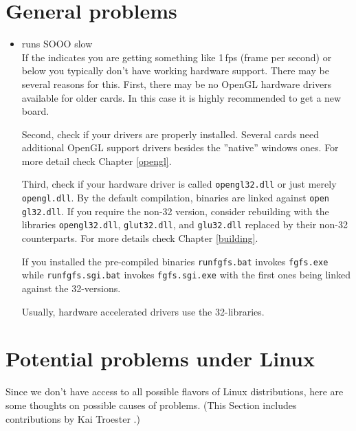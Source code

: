 \section{General problems}
\begin{itemize}
\item{\FlightGear runs SOOO slow}\\
 If the  indicates you are getting something like 1\,fps
 (frame per second) or below you typically don't have working hardware
  support. There may be several reasons for this. First,
 there may be no OpenGL hardware drivers available for older
 cards. In this case it is highly recommended to get a new board.

 Second, check if your drivers are properly installed. Several
 cards need additional OpenGL support drivers besides the
 ''native'' windows ones. For more detail check Chapter
 \ref{opengl}.

 Third, check if your hardware driver is called \texttt{opengl32.dll}
 or just merely \texttt{opengl.dll}. By the default compilation, binaries are linked against
 \texttt{open} \texttt{gl32.dll}. If you require the non-32 version,
 consider rebuilding \FlightGear with the libraries \texttt{opengl32.dll},
 \texttt{glut32.dll}, and \texttt{glu32.dll} replaced by their
 non-32 counterparts. For more details check Chapter
 \ref{building}.

 If you installed the pre-compiled binaries \texttt{runfgfs.bat} invokes
 \texttt{fgfs.exe} while \texttt{runfgfs.sgi.bat} invokes
 \texttt{fgfs.sgi.exe} with the first ones being linked against the 32-versions.

 Usually, hardware accelerated drivers use the 32-libraries.

 \end{itemize}

\section{Potential problems under Linux}

Since we don't have access to all possible flavors of Linux distributions, here are some
thoughts on possible causes of problems. (This Section includes contributions by Kai
Troester .)

